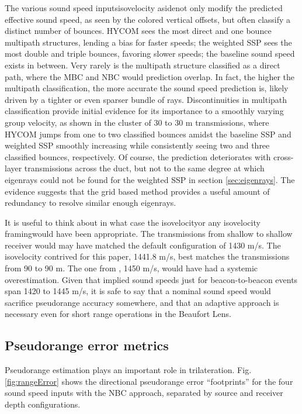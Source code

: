 The various sound speed inputs\textemdash isovelocity aside\textemdash not only modify the predicted effective sound speed, as seen by the colored vertical offsets, but often classify a distinct number of bounces.
HYCOM sees the most direct and one bounce multipath structures, lending a bias for faster speeds; the weighted SSP sees the most double and triple bounces, favoring slower speeds; the baseline sound speed exists in between.
Very rarely is the multipath structure classified as a direct path, where the MBC and NBC would prediction overlap.
In fact, the higher the multipath classification, the more accurate the sound speed prediction is, likely driven by a tighter or even sparser bundle of rays.
 Discontinuities in multipath classification provide initial evidence for its importance to a smoothly varying group velocity, as shown in the cluster of 30 to 30 m transmissions, where HYCOM jumps from one to two classified bounces amidst the baseline SSP and weighted SSP smoothly increasing while consistently seeing two and three classified bounces, respectively.
Of course, the prediction deteriorates with cross-layer transmissions across the duct, but not to the same degree at which eigenrays could not be found for the weighted SSP in section \ref{sec:eigenrays}.
The evidence suggests that the grid based method provides a useful amount of redundancy to resolve similar enough eigenrays.

It is useful to think about in what case the isovelocity\textemdash or any isovelocity framing\textemdash would have been appropriate.
The transmissions from shallow to shallow receiver would may have matched the default configuration of 1430 m/s.
The isovelocity contrived for this paper, 1441.8 m/s, best matches the transmissions from 90 to 90 m.
The one from \citet{Graupe2019}, 1450 m/s, would have had a systemic overestimation.
Given that implied sound speeds just for beacon-to-beacon events span 1420 to 1445 m/s, it is safe to say that a nominal sound speed would sacrifice pseudorange accuracy somewhere, and that an adaptive approach is necessary even for short range operations in the Beaufort Lens.

\subsection{Pseudorange error metrics}

Pseudorange estimation plays an important role in trilateration.
Fig. \ref{fig:rangeError} shows the directional pseudorange error ``footprints'' for the four sound speed inputs with the NBC approach, separated by source and receiver depth configurations.

